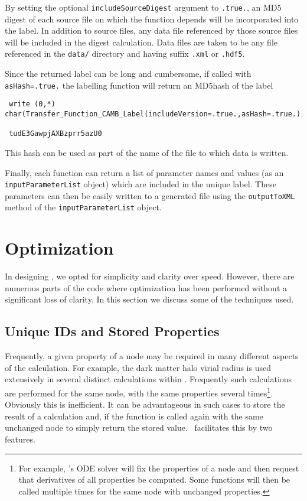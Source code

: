 By setting the optional {\tt includeSourceDigest} argument to {\tt .true.}, an MD5 digest of each source file on which the function depends will be incorporated into the label. In addition to source files, any data file referenced by those source files will be included in the digest calculation. Data files are taken to be any file referenced in the {\tt data/} directory and having suffix {\tt .xml} or {\tt .hdf5}.

Since the returned label can be long and cumbersome, if called with {\tt asHash=.true.} the labelling function will return an \gls{MD5hash} of the label
\begin{verbatim}
 write (0,*) char(Transfer_Function_CAMB_Label(includeVersion=.true.,asHash=.true.))
 
 tudE3GawpjAXBzprr5azU0
\end{verbatim}
This hash can be used as part of the name of the file to which data is written.

Finally, each function can return a list of parameter names and values (as an {\tt inputParameterList} object) which are included in the unique label. These parameters can then be easily written to a generated file using the {\tt outputToXML} method of the {\tt inputParameterList} object.

\section{Optimization}\label{sec:Optimization}

In designing \glc, we opted for simplicity and clarity over speed. However, there are numerous parts of the code where optimization has been performed without a significant loss of clarity. In this section we discuss some of the techniques used.

\subsection{Unique IDs and Stored Properties}

Frequently, a given property of a node may be required in many different aspects of the calculation. For example, the dark matter halo virial radius is used extensively in several distinct calculations within \glc. Frequently such calculations are performed for the same node, with the same properties several times\footnote{For example, \glc's ODE solver will fix the properties of a node and then request that derivatives of all properties be computed. Some functions will then be called multiple times for the same node with unchanged properties.}. Obviously this is inefficient. It can be advantageous in such cases to store the result of a calculation and, if the function is called again with the same unchanged node to simply return the stored value. \glc\ facilitates this by two features.

